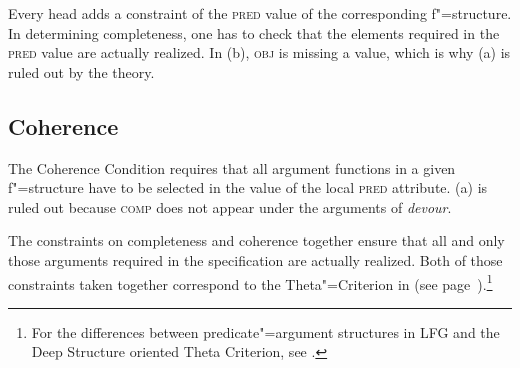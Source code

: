Every head adds a constraint of the \textsc{pred} value of the corresponding f"=structure. In determining completeness, one has to check that the elements required
in the \textsc{pred} value are actually realized. In (b), \textsc{obj} is missing a value, which is
why (a) is ruled out by the theory.

\eal
{}
\zl

\subsection{Coherence}

\addlines
The Coherence Condition requires that all argument functions in a given f"=structure have to be selected in the value of the local 
 \textsc{pred} attribute. (a) is ruled out because \textsc{comp} does not appear under the arguments of \emph{devour}.

\eal
{}
\zl

\noindent
The constraints on completeness and coherence together ensure that all and only those arguments required in
the \pred specification are actually realized.
Both of those constraints taken together correspond to the Theta"=Criterion in \gbt (see
page~\pageref{theta-Kriterium}).\footnote{%
For the differences between predicate"=argument structures in LFG and the Deep Structure oriented Theta Criterion, see .} 

